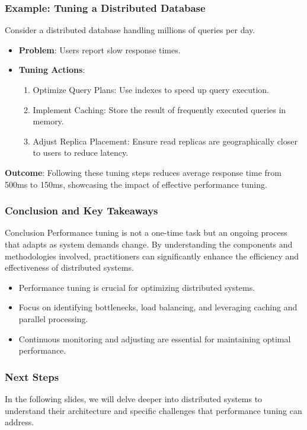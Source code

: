 \documentclass{beamer}
\begin{document}
\begin{frame}[fragile]
    \frametitle{Example: Tuning a Distributed Database}
    Consider a distributed database handling millions of queries per day. 
    \begin{itemize}
        \item \textbf{Problem}: Users report slow response times.
        \item \textbf{Tuning Actions}:
        \begin{enumerate}
            \item Optimize Query Plans: Use indexes to speed up query execution.
            \item Implement Caching: Store the result of frequently executed queries in memory.
            \item Adjust Replica Placement: Ensure read replicas are geographically closer to users to reduce latency.
        \end{enumerate}
    \end{itemize}
    \textbf{Outcome}: Following these tuning steps reduces average response time from 500ms to 150ms, showcasing the impact of effective performance tuning.
\end{frame}

\begin{frame}[fragile]
    \frametitle{Conclusion and Key Takeaways}
    \begin{block}{Conclusion}
        Performance tuning is not a one-time task but an ongoing process that adapts as system demands change. By understanding the components and methodologies involved, practitioners can significantly enhance the efficiency and effectiveness of distributed systems.
    \end{block}
    \begin{itemize}
        \item Performance tuning is crucial for optimizing distributed systems.
        \item Focus on identifying bottlenecks, load balancing, and leveraging caching and parallel processing.
        \item Continuous monitoring and adjusting are essential for maintaining optimal performance.
    \end{itemize}
\end{frame}

\begin{frame}[fragile]
    \frametitle{Next Steps}
    In the following slides, we will delve deeper into distributed systems to understand their architecture and specific challenges that performance tuning can address.
\end{frame}
\end{document}
